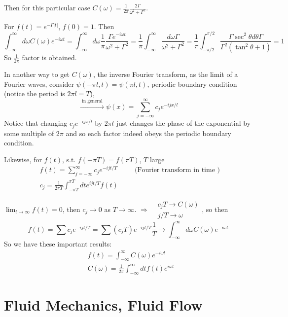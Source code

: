 \documentclass[10pt]{amsart}
\begin{document}
\begin{multicols*}{2}
Then for this particular case $C(\omega) = \frac{1}{2\pi} \frac{ 2\Gamma}{ \omega^2 + \Gamma^2}$.

For $f(t) = e^{-\Gamma |t|}$, $f(0) = 1$. Then
\[
\int_{-\infty}^{\infty} d\omega C(\omega) e^{-i\omega t} = \int_{-\infty}^{\infty} d\omega \frac{1}{\pi} \frac{ \Gamma e^{-i\omega t} }{ \omega^2 + \Gamma^2} = \frac{1}{\pi} \int_{-\infty}^{\infty} \frac{d\omega \Gamma}{ \omega^2 + \Gamma^2} = \frac{1}{ \pi} \int_{-\pi/2}^{\pi/2} \frac{ \Gamma \sec^2{\theta} d\theta \Gamma}{ \Gamma^2 (\tan^2{\theta} + 1) } = 1
\]
So $\frac{1}{2\pi}$ factor is obtained.

In another way to get $C(\omega)$, the inverse Fourier transform, as the limit of a Fourier waves, consider $\psi(-\pi l,t) = \psi(\pi l,t) $, periodic boundary condition (notice the period is $2\pi l = T$), 
\[
\xrightarrow{ \text{ in general } } \psi(x) = \sum_{j=-\infty}^{\infty} c_j e^{-ijx/l}
\]
Notice that changing $c_j e^{-ijx/l}$ by $2\pi l$ just changes the phase of the exponential by some multiple of $2\pi$ and so each factor indeed obeys the periodic boundary condition.

Likewise, for $f(t)$, s.t. $f(-\pi T) = f(\pi T)$, $T$ large
\[
\begin{aligned}
	& f(t) = \sum_{j=-\infty}^{\infty} c_j e^{-ijt/T} \quad \quad \, \text{ (Fourier transform in time ) } \\
	& c_j = \frac{1}{2\pi T} \int_{-\pi T}^{\pi T} dt e^{ijt/T} f(t) 
\end{aligned}
\]

$\lim_{t\to \infty} f(t) = 0$, then $c_j \to 0$ as $T \to \infty$.  $\Longrightarrow \begin{aligned}
	& c_j T \to C(\omega) \\
	& j/T \to \omega 
\end{aligned}$, so then
\[
f(t) = \sum c_j e^{-ij t/T} = \sum (c_j T) e^{-ijt/T} \frac{1}{T} \to \int_{-\infty}^{\infty} d\omega C(\omega) e^{-i \omega t} 
\]
So we have these important results:
\begin{align}
	& \boxed{ f(t)  = \int_{-\infty}^{\infty} C(\omega) e^{- i\omega t}  }\\
	& \boxed{ C(\omega)  = \frac{1}{2\pi} \int_{-\infty}^{\infty} dt f(t) e^{ i \omega t}  }
\end{align}


\section{Fluid Mechanics, Fluid Flow}


\end{multicols*}
\end{document}
